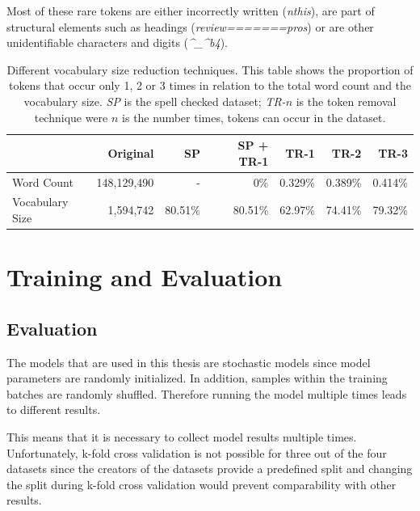 Most of these rare tokens are either incorrectly written {(\textit{nthis})}, are part of structural elements such as headings {(\textit{review=======pros})} or are other unidentifiable characters and digits ({\textit{\^{}\_\^{}b4}}).

\begin{table}[]
	\centering
	\begin{tabular}{lrrrrrr}
			\toprule
							& Original  	& SP & SP + TR-1 & TR-1 & TR-2 & TR-3 \\
			\midrule
			Word Count      &148,129,490 	& -              & 0\%           & 0.329\%         & 0.389\%         & 0.414\%            \\
			Vocabulary Size & 1,594,742   	& 80.51\%        & 80.51\% 		 & 62.97\%         & 74.41\%         & 79.32\%      \\  
			\bottomrule 	
	\end{tabular}

	\caption{Different vocabulary size reduction techniques. This table shows the proportion of tokens that occur only 1, 2 or 3 times in relation to the total word count and the vocabulary size. \textit{SP} is the spell checked dataset; \textit{TR-}$n$ is the token removal technique were $n$ is the number times, tokens can occur in the dataset.}
	\label{tab:05_amazonVocabSize}
\end{table}

\section{Training and Evaluation}
\label{sec:05_TrainingAndEvaluation}

\subsection{Evaluation}

The models that are used in this thesis are stochastic models since model parameters are randomly initialized. In addition, samples within the training batches are randomly shuffled. Therefore running the model multiple times leads to different results.

This means that it is necessary to collect model results multiple times. Unfortunately, k-fold cross validation is not possible for three out of the four datasets since the creators of the datasets provide a predefined split and changing the split during k-fold cross validation would prevent comparability with other results.

